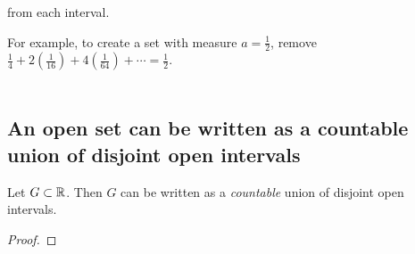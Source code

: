     from each interval.

    For example, to create a set with measure $a = \frac{1}{2}$,
    remove $\frac{1}{4} + 2(\frac{1}{16}) + 4(\frac{1}{64}) + \cdots = \frac{1}{2}$.

    \begin{align*}

    \end{align*}

\subsection{An open set can be written as a countable union of disjoint open intervals}

\begin{theorem}
  Let $G \subset \mathbb{R}$. Then $G$ can be written as a {\it countable} union of disjoint open intervals.
\end{theorem}

\begin{proof}

\end{proof}

